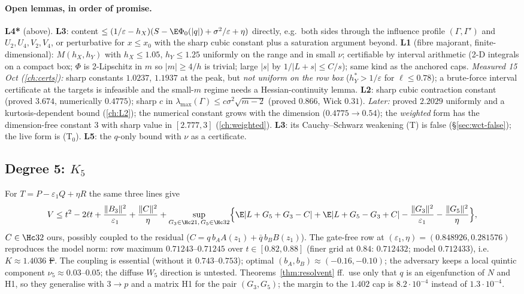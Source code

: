\paragraph{Open lemmas, in order of promise.} \textbf{L4*} (above). \textbf{L3}: content $\le(1/\varepsilon-h_X)(S-\E\Phi_0(|q|)+\sigma^2/\varepsilon+\eta)$ directly, e.g.\ both sides
through the influence profile $(\Gamma,\Gamma')$ and $U_2,U_4,V_2,V_4$, or perturbative for $x\le x_0$ with the sharp cubic constant plus a saturation argument beyond.
\textbf{L1} (fibre majorant, finite-dimensional): $M(h_X,h_Y)$ with $h_X\le1.05$, $h_Y\le1.25$ uniformly on the range and in small $\nu$; certifiable by interval
arithmetic (2-D integrals on a compact box; $\Phi$ is 2-Lipschitz in $m$ so $|m|\ge4/h$ is trivial; large $|s|$ by $1/|L+s|\le C/s$); same kind as the anchored
caps. \emph{Measured 15 Oct (\autoref{ch:certs}):} sharp constants $1.0237$, $1.1937$ at the peak, but \emph{not uniform on the row box} ($h_Y^*>1/\varepsilon$ for $\ell\le0.78$); a brute-force
interval certificate at the targets is infeasible and the small-$m$ regime needs a Hessian-continuity lemma. \textbf{L2}: sharp cubic contraction constant (proved $3.674$, numerically $0.4775$); sharp $c$ in $\lambda_{\max}(\Gamma)\le c\sigma^2\sqrt{m-2}$ (proved $0.866$, Wick $0.31$).
\emph{Later:} proved $2.2029$ uniformly and a kurtosis-dependent bound (\autoref{ch:L2}); the numerical constant grows with the dimension ($0.4775\to0.54$); the \emph{weighted} form has the
dimension-free constant $3$ with sharp value in $[2.777,3]$ (\autoref{ch:weighted}). \textbf{L3}: its Cauchy--Schwarz weakening (T) is false (\S\ref{sec:wct-false}); the live form is (T$_0$).
\textbf{L5}: the $q$-only bound with $\nu$ as a certificate.

\subsection{Degree 5: $K_5$}
For $T=P-\varepsilon_1Q+\eta R$ the same three lines give
\[
V\le t^2-2\ell t+\frac{\|B_3\|^2}{\varepsilon_1}+\frac{\|C\|^2}\eta+\sup_{G_3\in\Hc21,\,G_5\in\Hc32}\Bigl\{\E|L+G_5+G_3-C|+\E|L+G_5-G_3+C|-\frac{\|G_3\|^2}{\varepsilon_1}-\frac{\|G_5\|^2}\eta\Bigr\},
\]
$C\in\Hc32$ ours, possibly coupled to the residual ($C=q\,b_AA(z_1)+\bar q\,b_BB(z_1)$). The gate-free row at $(\varepsilon_1,\eta)=(0.848926,0.281576)$ reproduces the model norm:
row maximum $0.71243$--$0.71245$ over $t\in[0.82,0.88]$ (finer grid at $0.84$: $0.712432$; model $0.712433$), i.e.\ $K\approx1.4036$ \st{F}. The coupling is essential
(without it $0.743$--$0.753$); optimal $(b_A,b_B)\approx(-0.16,-0.10)$; the adversary keeps a local quintic component $\nu_5\approx0.03$--$0.05$; the diffuse $W_5$ direction
is untested. Theorems~\ref{thm:resolvent} ff.\ use only that $q$ is an eigenfunction of $N$ and H1, so they generalise with $3\to p$ and a matrix H1 for the pair
$(G_3,G_5)$; the margin to the $1.402$ cap is $8.2\cdot10^{-4}$ instead of $1.3\cdot10^{-4}$.

